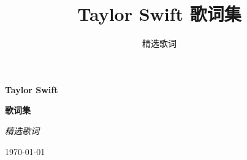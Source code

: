 \documentclass[12pt]{article}
\title{\Large\textbf{Taylor Swift 歌词集}}
\author{\large 精选歌词}
\date{}
\begin{document}
\begin{titlepage}
\begin{center}
\vspace*{5cm}
{\Huge\bfseries Taylor Swift\par}
\vspace{1cm}
{\Large\bfseries 歌词集\par}
\vspace{2cm}
{\large\textit{精选歌词}\par}
\vfill
{\large\today\par}
\end{center}
\end{titlepage}

\tableofcontents
\newpage

\clearpage  %

\clearpage  %

\end{document}
